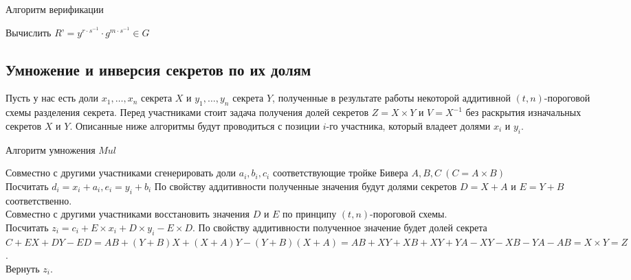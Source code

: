 \documentclass[a4paper,12pt]{article}
\theoremstyle{definition}
\begin{document}
		\begin{algorithm}[H]
			\caption{Алгоритм верификации}
			\label{alg:EGverify}
			\SetAlgoNoEnd \SetAlgoNoLine 
			
			
			Вычислить $R’= y^{r\cdot s^{-1}} \cdot g^{m\cdot s^{-1}} \in G$
			\\ 
						
		\end{algorithm}		
		
		
		\subsection{Умножение и инверсия секретов по их долям} \label{applic:MultInv}
		
		Пусть у нас есть доли $x_1, \dots, x_n$ секрета $X$ и $y_1, \dots, y_n$ секрета $Y$, полученные в результате работы некоторой аддитивной $(t, n)$-пороговой схемы разделения секрета. Перед участниками стоит задача получения долей секретов $Z=X\times Y$ и $V=X^{-1}$ без раскрытия изначальных секретов $X$ и $Y$. Описанные ниже алгоритмы будут проводиться с позиции $i$-го участника, который владеет долями $x_i$ и $y_i$.
		
		\begin{algorithm}
			\label{alg:Tmult}
			\caption{Алгоритм умножения $Mul$}

			
			
			Совместно с другими участниками сгенерировать доли $a_i, b_i, c_i$ соответствующие тройке Бивера $A, B, C\ (C=A\times B)$
			\\Посчитать $d_i = x_i + a_i, e_i = y_i + b_i$ \linebreak
			По свойству аддитивности полученные значения будут долями секретов $D=X+A$ и $E=Y+B$ соответственно.
			\\Совместно с другими участниками восстановить значения $D$ и $E$ по принципу $(t, n)$-пороговой схемы.
			\\Посчитать $z_i = c_i + E\times x_i + D\times y_i - E\times D$. \linebreak
			По свойству аддитивности полученное значение будет долей секрета \linebreak 
			$C + E X + D Y - E D = A B + (Y+B) X + (X+A) Y - (Y+B) (X+A) = A B + X Y + X B + X Y + Y A - X Y - X B - Y A - A B = X\times Y = Z$.
			\\Вернуть $z_i$.
			
			
		\end{algorithm}	
		
\end{document}
